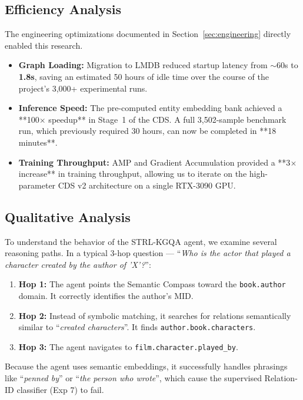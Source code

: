 \documentclass[11pt,a4paper]{article}
\newcommand{\STRL}{\textsc{STRL-KGQA}}
\begin{document}
\subsection{Efficiency Analysis}
The engineering optimizations documented in Section~\ref{sec:engineering}
directly enabled this research.
\begin{itemize}
    \item \textbf{Graph Loading:} Migration to LMDB reduced startup latency
          from $\sim$60s to \textbf{1.8s}, saving an estimated 50 hours of
          idle time over the course of the project's 3,000+ experimental runs.
    \item \textbf{Inference Speed:} The pre-computed entity embedding bank
          achieved a **100$\times$ speedup** in Stage~1 of the CDS. A full
          3,502-sample benchmark run, which previously required 30 hours, can
          now be completed in **18 minutes**.
    \item \textbf{Training Throughput:} AMP and Gradient Accumulation provided a
          **3$\times$ increase** in training throughput, allowing us to
          iterate on the high-parameter CDS v2 architecture on a single
          RTX-3090 GPU.
\end{itemize}

\subsection{Qualitative Analysis}
To understand the behavior of the \STRL{} agent, we examine several reasoning
paths. In a typical 3-hop question --- ``\emph{Who is the actor that played
a character created by the author of 'X'?}'':
\begin{enumerate}
    \item \textbf{Hop 1:} The agent points the Semantic Compass toward the
          \texttt{book.author} domain. It correctly identifies the author's MID.
    \item \textbf{Hop 2:} Instead of symbolic matching, it searches for
          relations semantically similar to ``\emph{created characters}''. It
          finds \texttt{author.book.characters}.
    \item \textbf{Hop 3:} The agent navigates to \texttt{film.character.played\_by}.
\end{enumerate}
Because the agent uses semantic embeddings, it successfully handles phrasings
like ``\emph{penned by}'' or ``\emph{the person who wrote}'', which cause the
supervised Relation-ID classifier (Exp 7) to fail.
\end{document}
